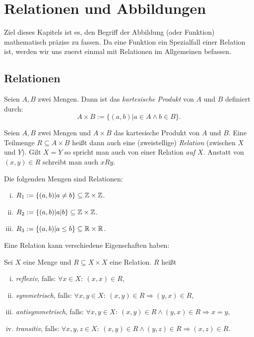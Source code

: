 \chapter{Relationen und Abbildungen}

Ziel dieses Kapitels ist es, den Begriff der Abbildung (oder Funktion)
mathematisch präzise zu fassen.
Da eine Funktion ein Spezialfall einer Relation ist, werden wir uns zuerst
einmal mit Relationen im Allgemeinen befassen.

\section{Relationen}

\begin{mydef}
Seien $A,B$ zwei Mengen. Dann ist das \textit{kartesische Produkt} von $A$ und $B$
definiert durch:
\[
    A \times B := \{ (a,b) | a \in A \wedge b \in B \}.
\]
\end{mydef}


\begin{mydef}
Seien $A,B$ zwei Mengen und $A \times B$ das kartesische Produkt von
$A$ und $B$.
Eine Teilmenge $R \subseteq A \times B$ heißt dann auch eine (zweistellige)
\textit{Relation} (zwischen $X$ und $Y$).
Gilt $X = Y$ so spricht man auch von einer Relation \textit{auf} $X$.
Anstatt von $(x,y) \in R$ schreibt man auch $xRy$.
\end{mydef}


\begin{example}
Die folgenden Mengen sind Relationen:

\begin{enumerate}[(i)]
\item $R_1 := \{(a,b) | a \neq b \} \subseteq \mathbb{Z} \times \mathbb{Z}$.
\item $R_2 := \{ (a,b) | a | b \} \subseteq \mathbb{Z} \times \mathbb{Z}$.
\item $R_3 := \{(a,b) | a \leq b\} \subseteq \mathbb{R} \times \mathbb{R}$.
\end{enumerate}
\end{example}

Eine Relation kann verschiedene Eigenschaften haben:

\begin{mydef}
Sei $X$ eine Menge und $R \subseteq X \times X$ eine Relation.
$R$ heißt
\begin{enumerate}[(i)]
\item \textit{reflexiv}, falls: $\forall x \in X\!:\ (x,x) \in R$,

\item \textit{symmetrisch}, falls:
$\forall x,y \in X\!:\ (x,y) \in R \Rightarrow (y,x) \in R$,

\item \textit{antisymmetrisch}, falls:
$\forall x,y \in X\!:\ (x,y) \in R \wedge (y,x) \in R \Rightarrow x = y$,

\item \textit{transitiv}, falls:
$\forall x,y,z \in X\!:\ (x,y) \in R \wedge (y,z) \in R
\Rightarrow (x,z) \in R$.
\end{enumerate}
\end{mydef}



